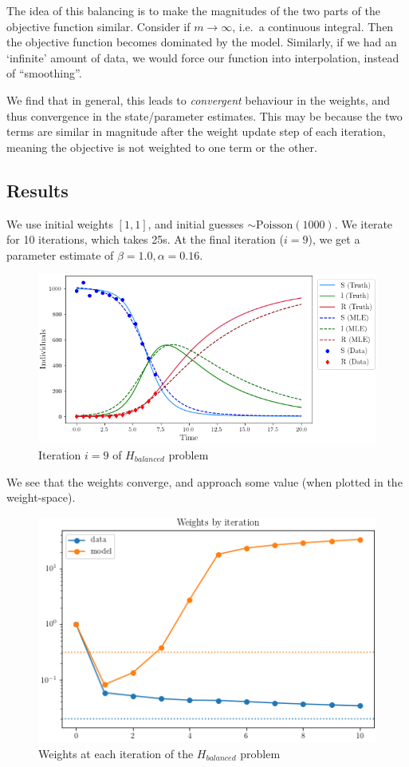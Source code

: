 The idea of this balancing is to make the magnitudes of the two parts of
the objective function similar. Consider if \(m \to \infty\), i.e.~a
continuous integral. Then the objective function becomes dominated by
the model. Similarly, if we had an `infinite' amount of data, we would
force our function into interpolation, instead of ``smoothing''.

We find that in general, this leads to \emph{convergent} behaviour in
the weights, and thus convergence in the state/parameter estimates. This
may be because the two terms are similar in magnitude after the weight
update step of each iteration, meaning the objective is not weighted to
one term or the other.

\hypertarget{results-2}{%
\subsection{Results}\label{results-2}}

We use initial weights \([1, 1]\), and initial guesses
\(\sim \text{Poisson}(1000)\). We iterate for 10 iterations, which takes
25s. At the final iteration (\(i=9\)), we get a parameter estimate of
\(\beta = 1.0, \alpha=0.16\).

\begin{figure}
\centering
\includegraphics{img/balance_iter9.png}
\caption{Iteration \(i=9\) of \(H_{balanced}\) problem}
\end{figure}

We see that the weights converge, and approach some value (when plotted
in the weight-space).

\begin{figure}
\centering
\includegraphics{img/balance_weight.png}
\caption{Weights at each iteration of the \(H_{balanced}\) problem}
\end{figure}

